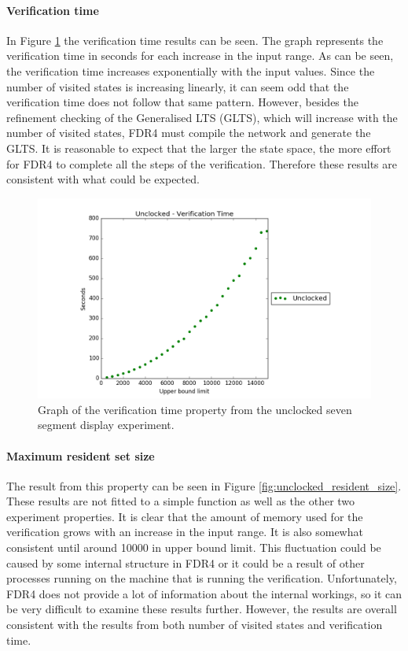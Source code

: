 \paragraph{Verification time}
In Figure \ref{fig:unclocked_verification} the verification time results can be seen. The graph represents the verification time in seconds for each increase in the input range. As can be seen, the verification time increases exponentially with the input values. Since the number of visited states is increasing linearly, it can seem odd that the verification time does not follow that same pattern. However, besides the refinement checking of the Generalised LTS (GLTS), which will increase with the number of visited states, FDR4 must compile the network and generate the GLTS. It is reasonable to expect that the larger the state space, the more effort for FDR4 to complete all the steps of the verification. Therefore these results are consistent with what could be expected.
\begin{figure}
    \centering
    \includegraphics[scale=0.6]{./figures/plots/unclocked_verification_time.png}
\caption{Graph of the verification time property from the unclocked seven segment display experiment.}
\label{fig:unclocked_verification}
\end{figure}
\paragraph{Maximum resident set size}
The result from this property can be seen in Figure \ref{fig:unclocked_resident_size}. These results are not fitted to a simple function as well as the other two experiment properties. It is clear that the amount of memory used for the verification grows with an increase in the input range. It is also somewhat consistent until around 10000 in upper bound limit. This fluctuation could be caused by some internal structure in FDR4 or it could be a result of other processes running on the machine that is running the verification. Unfortunately, FDR4 does not provide a lot of information about the internal workings, so it can be very difficult to examine these results further. However, the results are overall consistent with the results from both number of visited states and verification time.\\

